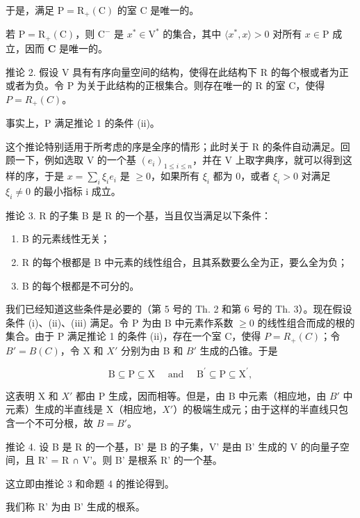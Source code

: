 于是，满足 \(\mathrm{P} = \mathrm{R}_{+}(\mathrm{C})\) 的室 C 是唯一的。

若 \(\mathrm{P} = \mathrm{R}_{+}(\mathrm{C})\)，则 \(\mathrm{C}^{-}\) 是 \(x^{*} \in \mathrm{V}^{*}\) 的集合，其中 \(\langle x^{*}, x \rangle > 0\) 对所有 \(x \in \mathrm{P}\) 成立，因而 \(\mathbf{C}\) 是唯一的。

推论 2. 假设 V 具有有序向量空间的结构，使得在此结构下 R 的每个根或者为正或者为负。令 P 为关于此结构的正根集合。则存在唯一的 R 的室 C，使得 \(P = R_{+}(C)\)。

事实上，P 满足推论 1 的条件 (ii)。

这个推论特别适用于所考虑的序是全序的情形；此时关于 R 的条件自动满足。回顾一下，例如选取 V 的一个基 \((e_{i})_{1\leqslant i\leqslant n}\)，并在 V 上取字典序，就可以得到这样的序，于是 \(x=\sum_{i}\xi_{i}e_{i}\) 是 \(\geqslant0\)，如果所有 \(\xi_{i}\) 都为 0，或者 \(\xi_{i}>0\) 对满足 \(\xi_{i}\neq0\) 的最小指标 i 成立。

推论 3. R 的子集 B 是 R 的一个基，当且仅当满足以下条件：

\begin{enumerate}
\def\labelenumi{(\roman{enumi})}
\item
  B 的元素线性无关；
\item
  R 的每个根都是 B 中元素的线性组合，且其系数要么全为正，要么全为负；
\item
  B 的每个根都是不可分的。
\end{enumerate}

我们已经知道这些条件是必要的（第 5 号的 Th. 2 和第 6 号的 Th. 3）。现在假设条件 (i)、(ii)、(iii) 满足。令 P 为由 B 中元素作系数 \(\geqslant0\) 的线性组合而成的根的集合。由于 P 满足推论 1 的条件 (ii)，存在一个室 C，使得 \(P = R_{+}(C)\)；令 \(B' = B(C)\)，令 X 和 \(X'\) 分别为由 B 和 \(B'\) 生成的凸锥。于是

\[
\mathrm{B} \subseteq \mathrm{P} \subseteq \mathrm{X} \quad \text { and } \quad \mathrm{B} ^ {\prime} \subseteq \mathrm{P} \subseteq \mathrm{X} ^ {\prime},
\]

这表明 X 和 \(X'\) 都由 P 生成，因而相等。但是，由 B 中元素（相应地，由 \(B'\) 中元素）生成的半直线是 X（相应地，\(X'\)）的极端生成元；由于这样的半直线只包含一个不可分根，故 \(B = B'\)。

推论 4. 设 B 是 R 的一个基，B' 是 B 的子集，V' 是由 B' 生成的 V 的向量子空间，且 R' = R ∩ V'。则 B' 是根系 R' 的一个基。

这立即由推论 3 和命题 4 的推论得到。

我们称 R' 为由 B' 生成的根系。

